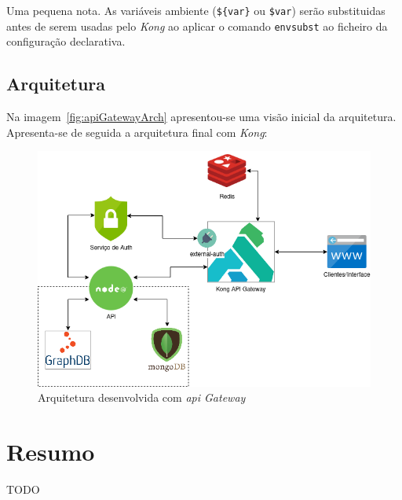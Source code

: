 Uma pequena nota. As variáveis ambiente (\verb|${var}| ou \verb|$var|) serão substituidas antes de serem usadas pelo \textit{Kong} ao aplicar o comando \texttt{envsubst} ao ficheiro da configuração declarativa.

\subsection{Arquitetura}
Na imagem~\ref{fig:apiGatewayArch} apresentou-se uma visão inicial da arquitetura. Apresenta-se de seguida a arquitetura final com \textit{Kong}: 
\begin{figure}[H]
    \begin{center}
        \includegraphics[width=1\textwidth]{img/apiGatewayArchFinal.png}
    \end{center}
    \caption{Arquitetura desenvolvida com \textit{\acrshort{api} Gateway}}\label{fig:apiGatewayArchFinal}
\end{figure}

\section{Resumo}
TODO

